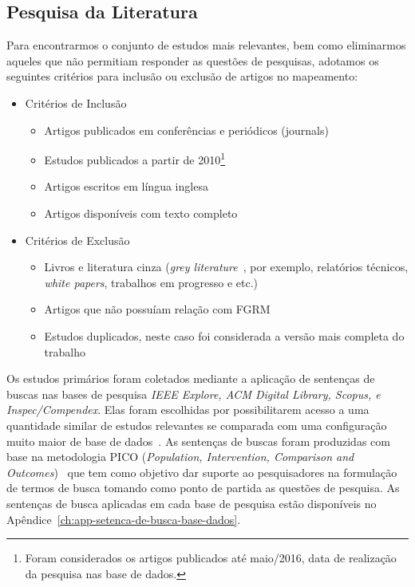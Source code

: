 \subsection{Pesquisa da Literatura}\label{subsec:map-pesquisa-literatura}

Para encontrarmos o conjunto de estudos mais relevantes, bem como eliminarmos
aqueles que não permitiam responder as questões de pesquisas, adotamos os
seguintes critérios para inclusão ou exclusão de artigos no mapeamento:

\begin{itemize}
	\item Critérios de Inclusão
		\begin{itemize}
			\item Artigos
				publicados em conferências e periódicos (journals)
			\item Estudos
				publicados a partir de 2010\footnote{Foram considerados os
                    artigos publicados até maio/2016, data de realização
					da pesquisa nas base de dados.}
			\item Artigos escritos em
				língua inglesa
			\item Artigos disponíveis com texto
				completo
		\end{itemize}
	\item Critérios de Exclusão
		\begin{itemize}
            \item Livros e literatura cinza (\textit{grey
                  literature}~\cite{keele2007guidelines}, por exemplo,
                  relatórios técnicos, \textit{white papers}, trabalhos em
                  progresso e etc.)
             \item Artigos que não possuíam relação com FGRM
			\item Estudos duplicados, neste caso foi considerada a versão mais
				completa do trabalho
		\end{itemize}
\end{itemize}

Os estudos primários foram coletados mediante a aplicação de sentenças de
buscas nas bases de pesquisa \textit{IEEE Explore, ACM Digital Library, Scopus,
    e Inspec/Compendex}. Elas foram escolhidas por possibilitarem  acesso a uma
quantidade similar de estudos relevantes se comparada com uma configuração
muito maior de base de dados~\cite{dybaa2007applying}. As sentenças de buscas
foram produzidas com base na metodologia PICO (\textit{Population,
    Intervention, Comparison and Outcomes})~\cite{keele2007guidelines} que tem
como objetivo dar suporte ao pesquisadores na formulação de termos de busca
tomando como ponto de partida as questões de pesquisa. As sentenças de busca
aplicadas em cada base de pesquisa estão disponíveis no
Apêndice~\ref{ch:app-setenca-de-busca-base-dados}.

